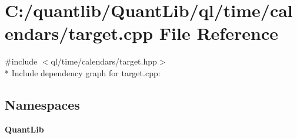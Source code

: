 \section{C\+:/quantlib/\+Quant\+Lib/ql/time/calendars/target.cpp File Reference}
\label{target_8cpp}
{\ttfamily \#include $<$ql/time/calendars/target.\+hpp$>$}\\*
Include dependency graph for target.\+cpp\+:
\subsection*{Namespaces}
\begin{DoxyCompactItemize}
\item 
 {\bf Quant\+Lib}
\end{DoxyCompactItemize}
